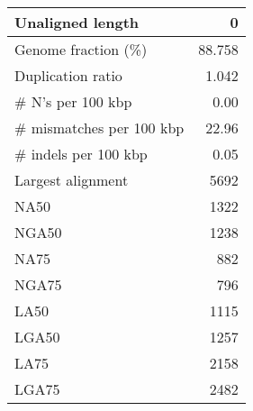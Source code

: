 \documentclass[12pt,a4paper]{article}
\begin{document}
\begin{table}[ht]
\begin{center}
\begin{tabular}{|l*{1}{|r}|}
Unaligned length & 0 \\ \hline
Genome fraction (\%) & 88.758 \\ \hline
Duplication ratio & 1.042 \\ \hline
\# N's per 100 kbp & 0.00 \\ \hline
\# mismatches per 100 kbp & 22.96 \\ \hline
\# indels per 100 kbp & 0.05 \\ \hline
Largest alignment & 5692 \\ \hline
NA50 & 1322 \\ \hline
NGA50 & 1238 \\ \hline
NA75 & 882 \\ \hline
NGA75 & 796 \\ \hline
LA50 & 1115 \\ \hline
LGA50 & 1257 \\ \hline
LA75 & 2158 \\ \hline
LGA75 & 2482 \\ \hline
\end{tabular}
\end{center}
\end{table}
\end{document}
